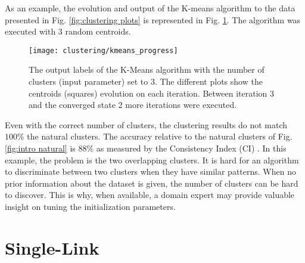 

As an example, the evolution and output of the K-means algorithm to the data presented in Fig. \ref{fig:clustering plots} is represented in Fig. \ref{fig:intro kmeans}.
The algorithm was executed with 3 random centroids.

\begin{figure}[hbtp]
    \centering
    \texttt{[image: clustering/kmeans\_progress]}
    \caption{The output labels of the K-Means algorithm with the number of clusters (input parameter) set to 3. The different plots show the centroids (squares) evolution on each iteration. Between iteration 3 and the converged state 2 more iterations were executed.}
    \label{fig:intro kmeans}
\end{figure}

Even with the correct number of clusters, the clustering results do not match $100\%$ the natural clusters.
The accuracy relative to the natural clusters of Fig. \ref{fig:intro natural} is $88\%$ as measured by the Consistency Index (CI) \cite{Fred2001}.
In this example, the problem is the two overlapping clusters.
It is hard for an algorithm to discriminate between two clusters when they have similar patterns.
When no prior information about the dataset is given, the number of clusters can be hard to discover.
This is why, when available, a domain expert may provide valuable insight on tuning the initialization parameters.

\section{Single-Link}
\label{sec:sl}

